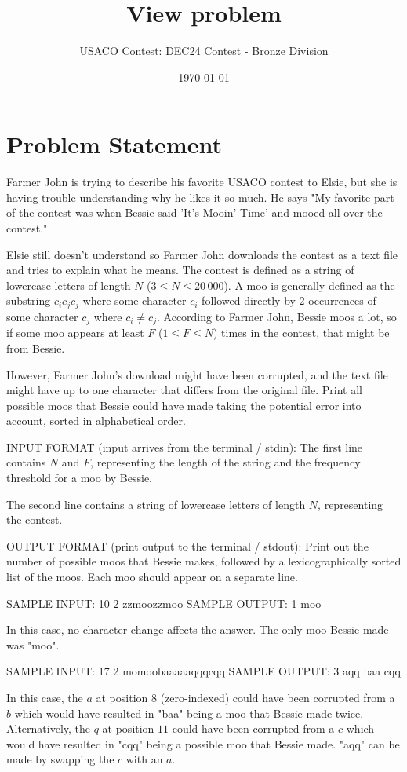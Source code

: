 \documentclass[12pt]{article}
\title{View problem}
\author{USACO Contest: DEC24 Contest - Bronze Division}
\date{\today}
\begin{document}
\maketitle

\section*{Problem Statement}


Farmer John is trying to describe his favorite USACO contest to Elsie, but she
is having trouble understanding why he likes it so much. He says "My favorite
part of the contest was when Bessie said 'It's Mooin' Time' and mooed all over
the contest."

Elsie still doesn't understand so Farmer John downloads the contest as a text
file and  tries to explain what he means. The contest is defined as a string of
lowercase letters of length $N$ ($3 \leq N \leq 20\,000$). A moo is generally
defined as the substring $c_ic_jc_j$ where some character $c_i$ followed
directly by $2$ occurrences of some  character $c_j$ where $c_i \neq c_j$.
According to Farmer John, Bessie moos a lot, so if some moo appears at least $F$
($1\le F\le N$) times in the contest, that might be from Bessie.  

However, Farmer John's download might have been corrupted, and the text file
might have up to one character that differs from the original file. Print all
possible moos that  Bessie could have made taking the potential error into
account, sorted in alphabetical order.

INPUT FORMAT (input arrives from the terminal / stdin):
The first line contains $N$ and $F$, representing the length of the string and
the frequency threshold for a moo by Bessie. 

The second line contains a string of lowercase letters of length $N$,
representing the contest.

OUTPUT FORMAT (print output to the terminal / stdout):
Print out the number of possible moos that Bessie makes, followed by a
lexicographically sorted list of the moos. Each moo should appear on a separate
line.

SAMPLE INPUT:
10 2
zzmoozzmoo
SAMPLE OUTPUT: 
1
moo

In this case, no character change affects the answer. The only moo Bessie made
was "moo".

SAMPLE INPUT:
17 2
momoobaaaaaqqqcqq
SAMPLE OUTPUT: 
3
aqq
baa
cqq

In this case, the $a$ at position $8$ (zero-indexed) could have been corrupted from a $b$ which
would have resulted in "baa" being a moo that Bessie made twice. Alternatively,
the $q$ at position $11$ could have been corrupted from a $c$ which would have
resulted in "cqq" being a possible moo that Bessie made. "aqq" can be made by
swapping the $c$ with an $a$.
\end{document}
